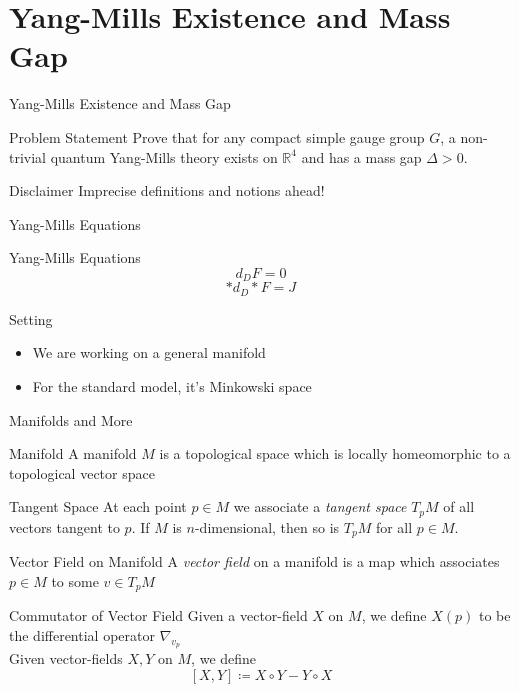 \documentclass{beamer}
\newcommand{\Real}{\mathbb{R}}
\begin{document}
  \section{Yang-Mills Existence and Mass Gap}
  \begin{frame}{Yang-Mills Existence and Mass Gap}
      \begin{block}{Problem Statement}
          Prove that for any compact simple gauge group $G$, a non-trivial
          quantum Yang-Mills theory exists on $\Real^4$ and has a mass gap
          $\Delta > 0$.
      \end{block}
  \end{frame}
  \begin{frame}{Disclaimer}
      \centering
      \alert{Imprecise definitions and notions ahead!}
  \end{frame}
  \begin{frame}{Yang-Mills Equations}
      \pause
      \begin{block}{Yang-Mills Equations}
          $$d_D F = 0$$
          $$*d_D * F = J$$
      \end{block}
      \pause
      \begin{block}{Setting}
          \begin{itemize}
              \item We are working on a general manifold \pause
              \item For the standard model, it's Minkowski space
          \end{itemize}
      \end{block}
  \end{frame}
  \begin{frame}{Manifolds and More}
      \linespread{0.7}
      \pause
      \begin{block}{Manifold}
          A manifold $M$ is a topological space which is locally homeomorphic
          to a topological vector space
      \end{block}
      \pause
      \begin{block}{Tangent Space}
          At each point $p \in M$ we associate a \textit{tangent space} 
          $T_p M$ of all vectors tangent to $p$. If $M$ is $n$-dimensional,
          then so is $T_p M$ for all $p \in M$.
      \end{block}
      \pause
      \begin{block}{Vector Field on Manifold}
          A \textit{vector field} on a manifold is a map which associates $p
          \in M$ to some $v \in T_p M$
      \end{block}
      \pause
      \begin{block}{Commutator of Vector Field}
          Given a vector-field $X$ on $M$, we define $X(p)$ to be the
          differential operator $\nabla_{v_p}$\pause \\
          Given vector-fields $X, Y$ on $M$, we define
          $$[X, Y] \coloneqq X\circ Y - Y \circ X$$
      \end{block}
  \end{frame}
\end{document}
